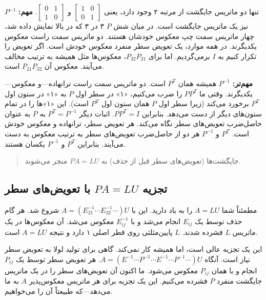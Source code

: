 \documentclass[12pt, a4paper]{book}
\begin{document}
	تنها دو ماتریس جایگشت از مرتبه ۲ وجود دارد، یعنی $\begin{bmatrix} 1 & 0 \\ 0 & 1 \end{bmatrix}$ و $\begin{bmatrix} 0 & 1 \\ 1 & 0 \end{bmatrix}$.
	\textbf{مهم:} $P^{-1}$ نیز یک ماتریس جایگشت است. در میان شش $P$ ۳ در ۳ که در بالا نمایش داده شد، چهار ماتریس سمت چپ معکوس خودشان هستند. دو ماتریس سمت راست معکوس یکدیگرند. در همه موارد، یک تعویض سطر منفرد معکوس خودش است. اگر تعویض را تکرار کنیم به $I$ برمی‌گردیم. اما برای $P_{32}P_{21}$، معکوس‌ها مثل همیشه به ترتیب مخالف می‌آیند. معکوس آن $P_{21}P_{32}$ است.
	
	\textbf{مهم‌تر:} $P^{-1}$ همیشه همان $P^T$ است. دو ماتریس سمت راست ترانهاده—و معکوس—یکدیگرند. وقتی ما $PP^T$ را ضرب می‌کنیم، «۱» در سطر اول $P$ به «۱» در ستون اول $P^T$ برخورد می‌کند (زیرا سطر اول $P$ همان ستون اول $P^T$ است). این «۱»ها را در تمام ستون‌های دیگر از دست می‌دهد. بنابراین $PP^T=I$.
	اثبات دیگر $P^T=P^{-1}$ به $P$ به عنوان حاصل‌ضرب تعویض‌های سطر نگاه می‌کند. هر تعویض سطر، ترانهاده و معکوس خودش است. $P^T$ و $P^{-1}$ هر دو از حاصل‌ضرب تعویض‌های سطر به ترتیب معکوس به دست می‌آیند. بنابراین $P^T$ و $P^{-1}$ یکسان هستند.
	\begin{quote}
		جایگشت‌ها (تعویض‌های سطر قبل از حذف) به $PA=LU$ منجر می‌شوند.
	\end{quote}
	
	\subsection*{تجزیه $PA=LU$ با تعویض‌های سطر}
	مطمئناً شما $A=LU$ را به یاد دارید. این با $A = (E_{21}^{-1} \cdots E_{32}^{-1} \cdots)U$ شروع شد. هر گام حذف توسط یک $E_{ij}$ انجام می‌شد و با $E_{ij}^{-1}$ معکوس می‌شد. آن معکوس‌ها در یک ماتریس $L$ فشرده شدند. $L$ پایین‌مثلثی روی قطر اصلی ۱ دارد و نتیجه $A=LU$ است.
	
	این یک تجزیه عالی است، اما همیشه کار نمی‌کند. گاهی برای تولید لولا به تعویض سطر نیاز است. آنگاه $A = (E^{-1} \cdots P^{-1} \cdots E^{-1} \cdots P^{-1} \cdots)U$. هر تعویض سطر توسط یک $P_{ij}$ انجام و با همان $P_{ij}$ معکوس می‌شود. ما اکنون آن تعویض‌های سطر را در یک ماتریس جایگشت منفرد $P$ فشرده می‌کنیم. این یک تجزیه برای هر ماتریس معکوس‌پذیر $A$ به ما می‌دهد—که طبیعتاً آن را می‌خواهیم.
	
\end{document}
